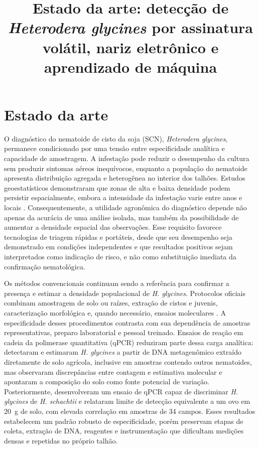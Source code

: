 \documentclass[12pt,a4paper]{article}
\title{Estado da arte: detecção de \textit{Heterodera glycines} por assinatura volátil, nariz eletrônico e aprendizado de máquina}
\author{}
\date{}
\begin{document}
\maketitle

\section{Estado da arte}

O diagnóstico do nematoide de cisto da soja (SCN), \textit{Heterodera glycines}, permanece condicionado por uma tensão entre especificidade analítica e capacidade de amostragem. A infestação pode reduzir o desempenho da cultura sem produzir sintomas aéreos inequívocos, enquanto a população do nematoide apresenta distribuição agregada e heterogênea no interior dos talhões. Estudos geoestatísticos demonstraram que zonas de alta e baixa densidade podem persistir espacialmente, embora a intensidade da infestação varie entre anos e locais \cite{avendano2003,poromarto2019}. Consequentemente, a utilidade agronômica do diagnóstico depende não apenas da acurácia de uma análise isolada, mas também da possibilidade de aumentar a densidade espacial das observações. Esse requisito favorece tecnologias de triagem rápidas e portáteis, desde que seu desempenho seja demonstrado em condições independentes e que resultados positivos sejam interpretados como indicação de risco, e não como substituição imediata da confirmação nematológica.

Os métodos convencionais continuam sendo a referência para confirmar a presença e estimar a densidade populacional de \textit{H. glycines}. Protocolos oficiais combinam amostragem de solo ou raízes, extração de cistos e juvenis, caracterização morfológica e, quando necessário, ensaios moleculares \cite{eppo2018}. A especificidade desses procedimentos contrasta com sua dependência de amostras representativas, preparo laboratorial e pessoal treinado. Ensaios de reação em cadeia da polimerase quantitativa (qPCR) reduziram parte dessa carga analítica: \citet{li2014qpcr} detectaram e estimaram \textit{H. glycines} a partir de DNA metagenômico extraído diretamente de solo agrícola, inclusive em amostras contendo outros nematoides, mas observaram discrepâncias entre contagem e estimativa molecular e apontaram a composição do solo como fonte potencial de variação. Posteriormente, \citet{baidoo2021} desenvolveram um ensaio de qPCR capaz de discriminar \textit{H. glycines} de \textit{H. schachtii} e relataram limite de detecção equivalente a um ovo em 20~g de solo, com elevada correlação em amostras de 34 campos. Esses resultados estabelecem um padrão robusto de especificidade, porém preservam etapas de coleta, extração de DNA, reagentes e instrumentação que dificultam medições densas e repetidas no próprio talhão.
\end{document}
